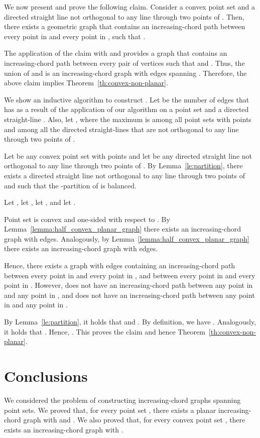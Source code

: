 \documentclass{llncs}
\begin{document}
We now present and prove the following claim. Consider a convex point set  and a directed straight line  not orthogonal to any line through two points of . Then, there exists a geometric graph  that contains an increasing-chord path between every point in  and every point in , such that .

The application of the claim with  and  provides a graph  that contains an increasing-chord path between every pair  of vertices such that  and . Thus, the union of  and  is an increasing-chord graph with  edges spanning . Therefore, the above claim implies Theorem~\ref{th:convex-non-planar}.

We show an inductive algorithm to construct . Let  be the number of edges that  has as a result of the application of our algorithm on a point set  and a directed straight-line . Also, let , where the maximum is among all point sets  with  points and among all the directed straight-lines  that are not orthogonal to any line through two points of .

Let  be any convex point set with  points and let  be any directed straight line not orthogonal to any line through two points of . By Lemma~\ref{le:partition}, there exists a directed straight line not orthogonal to any line through two points of  and such that the -partition of  is balanced.

Let , let , let , and let .

Point set  is convex and one-sided with respect to . By Lemma~\ref{lemma:half_convex_planar_graph} there exists an increasing-chord graph  with  edges. Analogously, by Lemma~\ref{lemma:half_convex_planar_graph} there exists an increasing-chord graph  with  edges.

Hence, there exists a graph  with  edges containing an increasing-chord path between every point in  and every point in , and between every point in  and every point in . However,  does not have an increasing-chord path between any point in  and any point in , and does not have an increasing-chord path between any point in  and any point in .

By Lemma~\ref{le:partition}, it holds that  and . By definition, we have . Analogously, it holds that . Hence, . This proves the claim and hence Theorem~\ref{th:convex-non-planar}.


\section{Conclusions}

We considered the problem of constructing increasing-chord graphs spanning point sets. We proved that, for every point set , there exists a planar increasing-chord graph  with  and . We also proved that, for every convex point set , there exists an increasing-chord graph  with .
\end{document}
